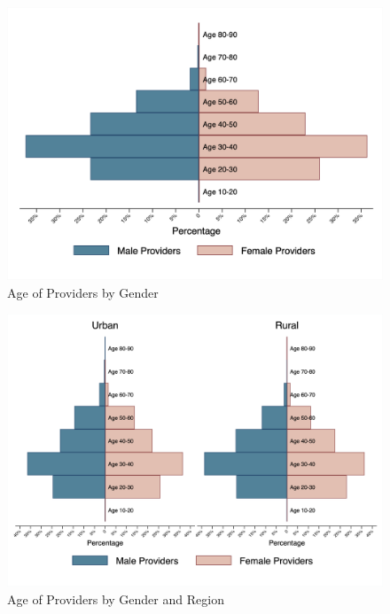 \documentclass{article}                 %
\begin{document}
			\begin{figure}[H] 
				\centering
				\caption{Age of Providers by Gender} 
				\includegraphics[width=\textwidth]{"../Output/Final/Per_providers"}
			\end{figure}
		
			\begin{figure}[H] 
				\centering
				\caption{Age of Providers by Gender and Region} 
				\includegraphics[width=\textwidth]{"../Output/Final/Per_providers_region"}
			\end{figure}	
		
\end{document}
